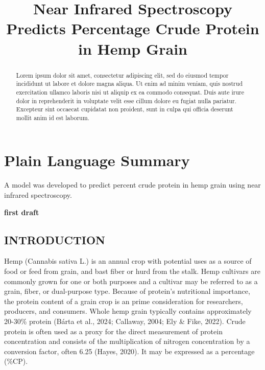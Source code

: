 \documentclass[
]{agujournal2019}
\begin{document}
\title{Near Infrared Spectroscopy Predicts Percentage Crude Protein in
Hemp Grain}



\begin{abstract}
Lorem ipsum dolor sit amet, consectetur adipiscing elit, sed do eiusmod
tempor incididunt ut labore et dolore magna aliqua. Ut enim ad minim
veniam, quis nostrud exercitation ullamco laboris nisi ut aliquip ex ea
commodo consequat. Duis aute irure dolor in reprehenderit in voluptate
velit esse cillum dolore eu fugiat nulla pariatur. Excepteur sint
occaecat cupidatat non proident, sunt in culpa qui officia deserunt
mollit anim id est laborum.
\end{abstract}

\section*{Plain Language Summary}
A model was developed to predict percent crude protein in hemp grain
using near infrared spectroscopy.



\textbf{first draft}

\subsection{INTRODUCTION}\label{introduction}

Hemp (Cannabis sativa L.) is an annual crop with potential uses as a
source of food or feed from grain, and bast fiber or hurd from the
stalk. Hemp cultivars are commonly grown for one or both purposes and a
cultivar may be referred to as a grain, fiber, or dual-purpose type.
Because of protein's nutritional importance, the protein content of a
grain crop is an prime consideration for researchers, producers, and
consumers. Whole hemp grain typically contains approximately 20-30\%
protein (Bárta et al., 2024; Callaway, 2004; Ely \& Fike, 2022). Crude
protein is often used as a proxy for the direct measurement of protein
concentration and consists of the multiplication of nitrogen
concentration by a conversion factor, often 6.25 (Hayes, 2020). It may
be expressed as a percentage (\%CP).
\end{document}
